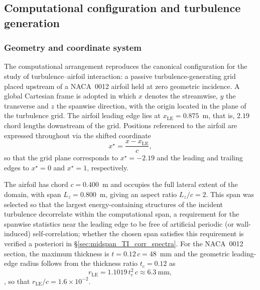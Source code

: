 \documentclass[lineno]{JFM-FLM_Au}
\begin{document}
\subsection{Computational configuration and turbulence generation}
\label{sec:method_configuration}


\subsubsection{Geometry and coordinate system}

The computational arrangement reproduces the canonical configuration for
the study of turbulence--airfoil interaction: a passive
turbulence-generating grid placed upstream of a NACA~0012 airfoil held at
zero geometric incidence. A global Cartesian frame is adopted in which
$x$ denotes the streamwise, $y$ the transverse and $z$ the spanwise
direction, with the origin located in the plane of the turbulence grid.
The airfoil leading edge lies at $x_{\mathrm{LE}} = 0.875$~m, that is,
$2.19$ chord lengths downstream of the grid. Positions referenced to the
airfoil are expressed throughout via the shifted coordinate
\begin{equation}
  x^{\star} = \frac{x - x_{\mathrm{LE}}}{c},
  \label{eq:xstar_def}
\end{equation}
so that the grid plane corresponds to $x^{\star} = -2.19$ and the leading
and trailing edges to $x^{\star} = 0$ and $x^{\star} = 1$, respectively.

The airfoil has chord $c = 0.400$~m and occupies the full lateral extent
of the domain, with span $L_z = 0.800$~m, giving an aspect ratio
$L_z/c = 2$. This span was selected so that the largest energy-containing
structures of the incident turbulence decorrelate within the
computational span, a requirement for the spanwise statistics near the
leading edge to be free of artificial periodic (or wall-induced)
self-correlation; whether the chosen span satisfies this requirement is
verified a posteriori in \S\ref{sec:midspan_TI_corr_spectra}. For the
NACA~0012 section, the maximum thickness is $t = 0.12\,c = 48$~mm and
the geometric leading-edge radius follows from the thickness ratio
$t_c = 0.12$ as
\begin{equation}
  r_{\mathrm{LE}} = 1.1019\,t_c^{2}\,c \approx 6.3~\mathrm{mm},
  \label{eq:rLE_def}
\end{equation}
\citep{AbbottDoenhoff1959}, so that
$r_{\mathrm{LE}}/c = 1.6\times10^{-2}$.
\end{document}
